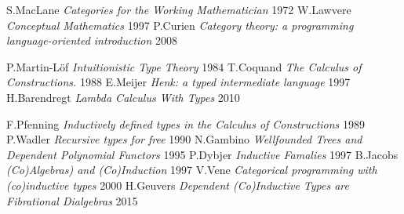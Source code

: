 \documentclass[9pt]{memoir}
\begin{document}
\begin{fullwidth}[width=\linewidth+4cm]
\begin{thebibliography}{99}

    S.MacLane \textit{Categories for the Working Mathematician} 1972
    W.Lawvere \textit{Conceptual Mathematics} 1997
     P.Curien \textit{Category theory: a programming language-oriented introduction} 2008

  P.Martin-Löf \textit{Intuitionistic Type Theory} 1984
    T.Coquand \textit{The Calculus of Constructions.} 1988
       E.Meijer \textit{Henk: a typed intermediate language} 1997
 H.Barendregt \textit{Lambda Calculus With Types} 2010

   F.Pfenning \textit{Inductively defined types in the Calculus of Constructions} 1989
     P.Wadler \textit{Recursive types for free} 1990
    N.Gambino \textit{Wellfounded Trees and Dependent Polynomial Functors} 1995
     P.Dybjer \textit{Inductive Famalies} 1997
     B.Jacobs \textit{(Co)Algebras) and (Co)Induction} 1997
       V.Vene \textit{Categorical programming with (co)inductive types} 2000
    H.Geuvers \textit{Dependent (Co)Inductive Types are Fibrational Dialgebras} 2015



\end{thebibliography}
\end{fullwidth}
\end{document}
